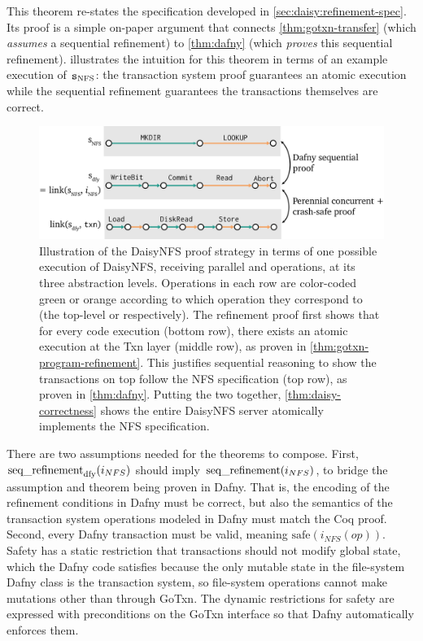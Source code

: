 This theorem re-states the specification developed in
\cref{sec:daisy:refinement-spec}. Its proof is a simple on-paper argument that
connects \cref{thm:gotxn-transfer} (which \emph{assumes} a sequential
refinement) to \cref{thm:dafny} (which \emph{proves} this sequential refinement).
 illustrates
the intuition for this theorem in terms of an example execution of $\texttt{s}_{\mathrm{NFS}}$: the transaction system proof guarantees an
atomic execution while the sequential refinement guarantees the transactions
themselves are correct.

\begin{figure}
  \centering
  \includegraphics{fig/refinement-execs.png}
  \caption[Overall DaisyNFS proof strategy]{Illustration of the DaisyNFS proof
    strategy in terms of one
    possible execution of DaisyNFS, receiving parallel  and 
    operations, at its three abstraction levels. Operations in each row are
    color-coded green or orange according to which operation they correspond to
    (the top-level  or  respectively). The refinement proof first
    shows that for every code execution (bottom row), there exists an atomic
    execution at the Txn layer (middle row), as proven in
    \cref{thm:gotxn-program-refinement}. This justifies sequential reasoning to
    show the transactions on top follow the NFS specification (top row), as
    proven in \cref{thm:dafny}. Putting the two together,
    \cref{thm:daisy-correctness} shows the entire DaisyNFS server atomically
    implements the NFS specification.}
  \label{fig:refinement-execs}
\end{figure}

There are two assumptions needed for the theorems to compose. First,
$\operatorname{seq\_refinement}_{\mathrm{dfy}}(i_{NFS})$ should imply $\operatorname{seq\_refinement}(i_{NFS})$,
to bridge the assumption and theorem being proven in Dafny. That is, the
encoding of the refinement conditions in Dafny must be correct, but also the
semantics of the transaction system operations modeled in Dafny must match the
Coq proof. Second, every Dafny transaction must be valid, meaning
$\mathrm{safe}(i_{NFS}(op))$. Safety has a static restriction that transactions
should not modify global state, which the Dafny code satisfies because the only
mutable state in the file-system Dafny class is the transaction system, so
file-system operations cannot make mutations other than through GoTxn. The
dynamic restrictions for safety are expressed with preconditions on the GoTxn
interface so that Dafny automatically enforces them.

